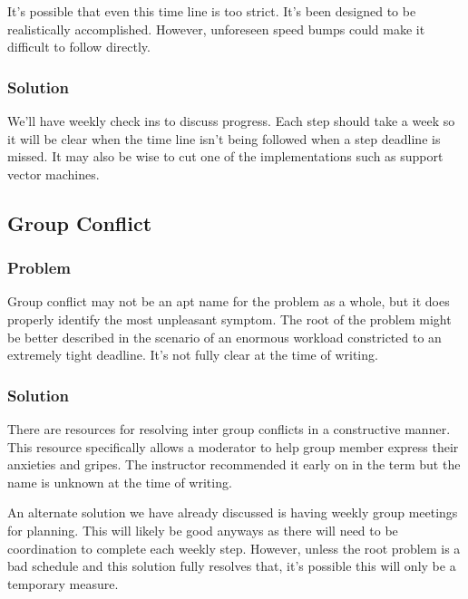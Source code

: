 \documentclass[12pt,journal,compsoc, draftclsnofoot,onecolumn]{IEEEtran}
\begin{document}
It's possible that even this time line is too strict.
It's been designed to be realistically accomplished.
However, unforeseen speed bumps could make it difficult to follow directly.

\subsubsection{Solution}

We'll have weekly check ins to discuss progress.
Each step should take a week so it will be clear when the time line isn't being followed when a step deadline is missed.
It may also be wise to cut one of the implementations such as support vector machines.

\subsection{Group Conflict}

\subsubsection{Problem}

Group conflict may not be an apt name for the problem as a whole, but it does properly identify the most unpleasant symptom.
The root of the problem might be better described in the scenario of an enormous workload constricted to an extremely tight deadline.
It's not fully clear at the time of writing.

\subsubsection{Solution}

There are resources for resolving inter group conflicts in a constructive manner.
This resource specifically allows a moderator to help group member express their anxieties and gripes.
The instructor recommended it early on in the term but the name is unknown at the time of writing.

\noindent
An alternate solution we have already discussed is having weekly group meetings for planning.
This will likely be good anyways as there will need to be coordination to complete each weekly step.
However, unless the root problem is a bad schedule and this solution fully resolves that, it's possible this will only be a temporary measure.
\end{document}
